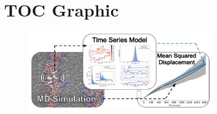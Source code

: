 \documentclass[aps,pre,preprint,groupedaddress,longbibliography]{revtex4-2}
\begin{document}
  

  \section*{TOC Graphic}
    
  \begin{figure}[!htb]
  \centering
  \includegraphics[width=3.25in]{toc.pdf}
  \end{figure}
\end{document}
